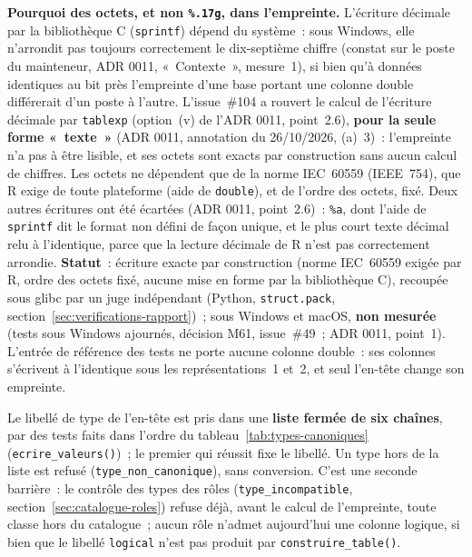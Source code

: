 \documentclass[a4paper,11pt]{article}
\newcommand{\code}[1]{\texttt{\small #1}}
\begin{document}
\medskip
\textbf{Pourquoi des octets, et non \code{\%.17g}, dans l'empreinte.}
L'écriture décimale par la bibliothèque C (\code{sprintf}) dépend du système~: sous Windows,
elle n'arrondit pas toujours correctement le dix-septième chiffre (constat
sur le poste du mainteneur, ADR 0011, «~Contexte~», mesure~1), si bien qu'à
données identiques au bit près l'empreinte d'une base portant une colonne
double différerait d'un poste à l'autre. L'issue~\#104 a rouvert le calcul
de l'écriture décimale par \code{tablexp} (option~(v) de l'ADR 0011,
point~2.6), \textbf{pour la seule forme «~texte~»} (ADR 0011, annotation du
26/10/2026, (a)~3)~: l'empreinte n'a pas à être lisible, et ses octets sont
exacts par construction sans aucun calcul de chiffres. Les octets ne dépendent que de la
norme IEC~60559 (IEEE~754), que R exige de toute plateforme (aide de
\code{double}), et de l'ordre des octets, fixé. Deux autres écritures ont été
écartées (ADR 0011, point~2.6)~: \code{\%a}, dont l'aide de \code{sprintf}
dit le format non défini de façon unique, et le plus court texte décimal
relu à l'identique, parce que la lecture décimale de R n'est pas
correctement arrondie. \textbf{Statut}~: écriture exacte par construction
(norme IEC~60559 exigée par R, ordre des octets fixé, aucune mise en forme
par la bibliothèque C), recoupée sous glibc par un juge indépendant (Python,
\code{struct.pack}, section~\ref{sec:verifications-rapport})~; sous Windows
et macOS, \textbf{non mesurée} (tests sous Windows ajournés, décision M61,
issue~\#49~; ADR 0011, point~1). L'entrée de
référence des tests ne porte aucune colonne double~: ses colonnes s'écrivent
à l'identique sous les représentations~1 et~2, et seul l'en-tête change son
empreinte.

\medskip
\noindent
Le libellé de type de l'en-tête est pris dans une \textbf{liste fermée de six
chaînes}, par des tests faits dans l'ordre du tableau~\ref{tab:types-canoniques}
(\code{ecrire\_valeurs()})~; le premier qui réussit fixe le libellé. Un
type hors de la liste est refusé (\code{type\_non\_canonique}), sans
conversion. C'est une seconde barrière~: le contrôle des types des rôles
(\code{type\_incompatible}, section~\ref{sec:catalogue-roles}) refuse déjà,
avant le calcul de l'empreinte, toute classe hors du catalogue~; aucun rôle
n'admet aujourd'hui une colonne logique, si bien que le libellé
\code{logical} n'est pas produit par \code{construire\_table()}.
\end{document}
